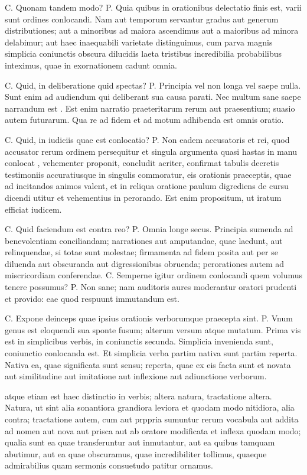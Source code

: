  C. Quonam tandem modo? P. Quia quibus in orationibus delectatio finis est, varii sunt ordines conlocandi. Nam aut temporum servantur gradus aut generum distributiones; aut a minoribus ad maiora ascendimus aut a maioribus ad minora delabimur; aut haec inaequabili varietate distinguimus, cum parva magnis simplicia coniunctis obscura dilucidis laeta tristibus incredibilia probabilibus inteximus, quae in exornationem cadunt omnia.

 C. Quid, in deliberatione quid spectas? P. Principia vel non longa vel saepe nulla. Sunt enim ad audiendum qui deliberant sua causa parati. Nec multum sane saepe narrandum est . Est enim narratio praeteritarum rerum aut praesentium; suasio autem futurarum. Qua re ad fidem et ad motum adhibenda est omnis oratio.

 C. Quid, in iudiciis quae est conlocatio? P. Non eadem accusatoris et rei, quod accusator rerum ordinem persequitur et singula argumenta quasi hastas in manu conlocat , vehementer proponit, concludit acriter, confirmat tabulis decretis testimoniis accuratiusque in singulis commoratur, eis orationis praeceptis, quae ad incitandos animos valent, et in reliqua oratione paulum digrediens de cursu dicendi utitur et vehementius in perorando. Est enim propositum, ut iratum efficiat iudicem.

 C. Quid faciendum est contra reo? P. Omnia longe secus. Principia sumenda ad benevolentiam conciliandam; narrationes aut amputandae, quae laedunt, aut relinquendae, si totae sunt molestae; firmamenta ad fidem posita aut per se diluenda aut obscuranda aut digressionibus obruenda; perorationes autem ad miscricordiam conferendae. C. Semperne igitur ordinem conlocandi quem volumus tenere possumus? P. Non sane; nam auditoris aures moderantur oratori prudenti et provido: eae quod respuunt immutandum est.

 C. Expone deinceps quae ipsius orationis verborumque praecepta sint. P. Vnum genus est eloquendi sua sponte fusum; alterum versum atque mutatum. Prima vis est in simplicibus verbis, in coniunctis secunda. Simplicia invenienda sunt, coniunctio conlocanda est. Et simplicia verba partim nativa sunt partim reperta. Nativa ea, quae significata sunt sensu; reperta, quae ex eis facta sunt et novata aut similitudine aut imitatione aut inflexione aut adiunctione verborum.

 atque etiam est haec distinctio in verbis; altera natura, tractatione altera. Natura, ut sint alia sonantiora grandiora leviora et quodam modo nitidiora, alia contra; tractatione autem, cum aut prppria sumuntur rerum vocabula aut addita ad nomen aut nova aut prisca aut ab oratore modificata et inflexa quodam modo; qualia sunt ea quae transferuntur aut inmutantur, aut ea quibus tamquam abutimur, aut ea quae obscuramus, quae incredibiliter tollimus, quaeque admirabilius quam sermonis consuetudo patitur ornamus.


